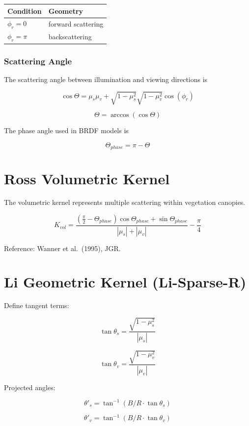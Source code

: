 \documentclass[
  letterpaper,
]{scrbook}
\begin{document}
\begin{longtable}[]{@{}ll@{}}
\toprule\noalign{}
Condition & Geometry \\
\midrule\noalign{}
\endhead
\bottomrule\noalign{}
\endlastfoot
\(\phi_r = 0\) & forward scattering \\
\(\phi_r = \pi\) & backscattering \\
\end{longtable}

\subsubsection{Scattering Angle}\label{scattering-angle}

The scattering angle between illumination and viewing directions is

\[
\cos\Theta =
\mu_s\mu_v +
\sqrt{1-\mu_s^2}\sqrt{1-\mu_v^2}\cos(\phi_r)
\]

\[
\Theta = \arccos(\cos\Theta)
\]

The phase angle used in BRDF models is

\[
\Theta_{phase} = \pi - \Theta
\]

\section{Ross Volumetric Kernel}\label{ross-volumetric-kernel}

The volumetric kernel represents multiple scattering within vegetation
canopies.

\[
K_{vol} =
\frac{\left(\frac{\pi}{2}-\Theta_{phase}\right)\cos\Theta_{phase} + \sin\Theta_{phase}}
{|\mu_s| + |\mu_v|}-\frac{\pi}{4}
\]

Reference: Wanner et al.~(1995), JGR.

\section{Li Geometric Kernel
(Li-Sparse-R)}\label{li-geometric-kernel-li-sparse-r}

Define tangent terms:

\[
\tan\theta_s = \frac{\sqrt{1-\mu_s^2}}{|\mu_s|}
\]

\[
\tan\theta_v = \frac{\sqrt{1-\mu_v^2}}{|\mu_v|}
\]

Projected angles:

\[
\theta'_s = \tan^{-1}(B/R \cdot \tan\theta_s)
\]

\[
\theta'_v = \tan^{-1}(B/R \cdot \tan\theta_v)
\]
\end{document}
